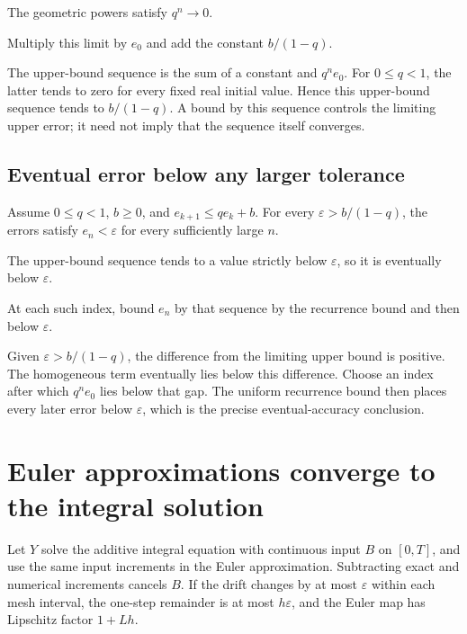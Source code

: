 \documentclass[11pt,a4paper]{report}
\begin{document}
The geometric powers satisfy \(q^n\to0\).



Multiply this limit by \(e_0\) and add the constant \(b/(1-q)\).



The upper-bound sequence is the sum of a constant and \(q^ne_0\). For \(0\le q<1\), the latter tends to zero for every fixed real initial value. Hence this upper-bound sequence tends to \(b/(1-q)\). A bound by this sequence controls the limiting upper error; it need not imply that the sequence itself converges.

\subsection{\texorpdfstring{Eventual error below any larger tolerance}{Eventual error below any larger tolerance}}
\label{report-step-UnadjustedLangevin-Recurrence-lean-5}


Assume \(0\le q<1\), \(b\ge0\), and \(e_{k+1}\le qe_k+b\). For every \(\varepsilon>b/(1-q)\), the errors satisfy \(e_n<\varepsilon\) for every sufficiently large \(n\).



The upper-bound sequence tends to a value strictly below \(\varepsilon\), so it is eventually below \(\varepsilon\).



At each such index, bound \(e_n\) by that sequence by the recurrence bound and then below \(\varepsilon\).



Given \(\varepsilon>b/(1-q)\), the difference from the limiting upper bound is positive. The homogeneous term eventually lies below this difference. Choose an index after which \(q^ne_0\) lies below that gap. The uniform recurrence bound then places every later error below \(\varepsilon\), which is the precise eventual-accuracy conclusion.

\section{\texorpdfstring{Euler approximations converge to the integral solution}{Euler approximations converge to the integral solution}}
\label{proof-module-UnadjustedLangevin-EulerLimit-lean}


Let \(Y\) solve the additive integral equation with continuous input \(B\) on \([0,T]\), and use the same input increments in the Euler approximation. Subtracting exact and numerical increments cancels \(B\). If the drift changes by at most \(\varepsilon\) within each mesh interval, the one-step remainder is at most \(h\varepsilon\), and the Euler map has Lipschitz factor \(1+Lh\).
\end{document}

